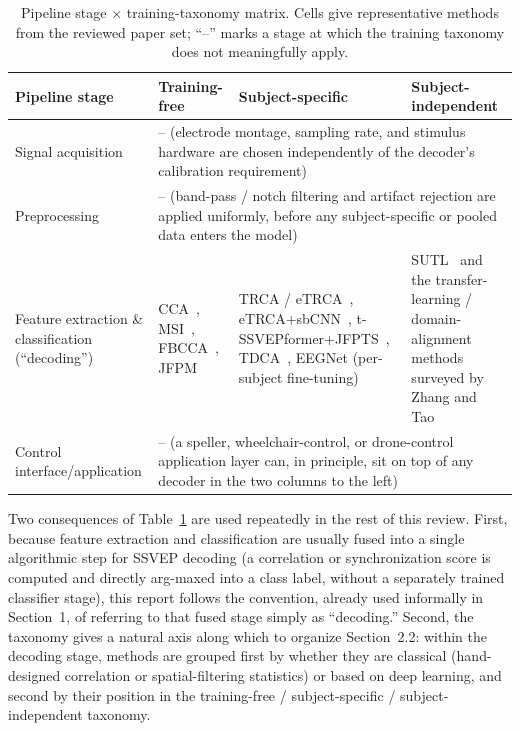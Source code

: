 \documentclass[11pt]{article}
\begin{document}
\begin{table}[htbp]
\centering
\caption{Pipeline stage $\times$ training-taxonomy matrix. Cells give representative methods from the reviewed paper set; ``--'' marks a stage at which the training taxonomy does not meaningfully apply.}
\label{tab:pipeline-taxonomy}
\small
\begin{tabular}{@{}p{3cm} p{3.6cm} p{3.6cm} p{3.6cm}@{}}
\toprule
\textbf{Pipeline stage} & \textbf{Training-free} & \textbf{Subject-specific} & \textbf{Subject-independent} \\
\midrule
Signal acquisition & \multicolumn{3}{p{10.8cm}}{-- (electrode montage, sampling rate, and stimulus hardware are chosen independently of the decoder's calibration requirement)} \\
\addlinespace
Preprocessing & \multicolumn{3}{p{10.8cm}}{-- (band-pass / notch filtering and artifact rejection are applied uniformly, before any subject-specific or pooled data enters the model)} \\
\addlinespace
Feature extraction \& classification (``decoding'') &
CCA~\cite{lin2007cca}, MSI~\cite{zhang2014msi}, FBCCA~\cite{chen2015fbcca}, JFPM~\cite{chen2015pnas} &
TRCA / eTRCA~\cite{nakanishi2018trca}, eTRCA\allowbreak+\allowbreak sbCNN~\cite{wei2025etrcasbcnn}, t-SSVEPformer\allowbreak+\allowbreak JFPTS~\cite{ding2026jfpts}, TDCA~\cite{liu2021tdca}, EEGNet (per-subject fine-tuning)~\cite{lawhern2018eegnet} &
SUTL~\cite{li2024sutl} and the transfer-learning / domain-alignment methods surveyed by Zhang and Tao~\cite{zhang2026mobilereview} \\
\addlinespace
Control interface/application & \multicolumn{3}{p{10.8cm}}{-- (a speller, wheelchair-control, or drone-control application layer can, in principle, sit on top of any decoder in the two columns to the left)} \\
\bottomrule
\end{tabular}
\end{table}

Two consequences of Table~\ref{tab:pipeline-taxonomy} are used repeatedly in the rest of this review. First, because feature extraction and classification are usually fused into a single algorithmic step for SSVEP decoding (a correlation or synchronization score is computed and directly arg-maxed into a class label, without a separately trained classifier stage), this report follows the convention, already used informally in Section~1, of referring to that fused stage simply as ``decoding.'' Second, the taxonomy gives a natural axis along which to organize Section~2.2: within the decoding stage, methods are grouped first by whether they are classical (hand-designed correlation or spatial-filtering statistics) or based on deep learning, and second by their position in the training-free / subject-specific / subject-independent taxonomy.
\end{document}
